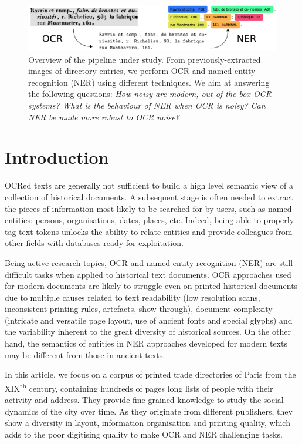 \begin{figure}[!h]
    \centering
    \includegraphics[width=.9\textwidth]{figs/overview-intro.pdf}
    \caption{%
    Overview of the pipeline under study.
    From previously-extracted images of directory entries, 
    we perform OCR and named entity recognition (NER) using different techniques.
    We aim at answering the following questions:
    \emph{How noisy are modern, out-of-the-box OCR systems?}
    \emph{What is the behaviour of NER when OCR is noisy?}
    \emph{Can NER be made more robust to OCR noise?}
    }
    \label{fig.pipeline-overview}
\end{figure}
\clearpage%

\section{Introduction}

OCRed texts are generally not sufficient to build a high level semantic view of a collection of historical documents.
A subsequent stage is often needed to extract the pieces of information most likely to be searched for by users, such as named entities: persons, organisations, dates, places, etc.
Indeed, being able to properly tag text tokens unlocks the ability to relate entities and provide colleagues from other fields with databases ready for exploitation.

Being active research topics, OCR and named entity recognition (NER) are still difficult tasks when applied to historical text documents.
OCR approaches used for modern documents are likely to struggle even on printed historical documents due to multiple causes related to text readability (low resolution scans, inconsistent printing rules, artefacts, show-through), document complexity (intricate and versatile page layout, use of ancient fonts and special glyphs) and the variability inherent to the great diversity of historical sources.
On the other hand, the semantics of entities in NER approaches developed for modern texts may be different from those in ancient texts.

In this article, we focus on a corpus of printed trade directories of Paris from the XIX\textsuperscript{th} century, containing hundreds of pages long lists of people with their activity and address.
They provide fine-grained knowledge to study the social dynamics of the city over time.
As they originate from different publishers, they show a diversity in layout, information organisation and printing quality, which adds to the poor digitising quality to make OCR and NER challenging tasks.

